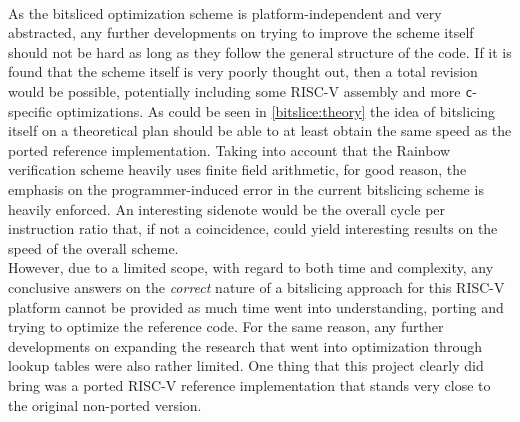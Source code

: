 \medskip\\
As the bitsliced optimization scheme is platform-independent and very abstracted, any further developments on trying to improve the scheme itself should not be hard as long as they follow the general structure of the code. If it is found that the scheme itself is very poorly thought out, then a total revision would be possible, potentially including some RISC-V assembly and more \texttt{c}-specific optimizations. As could be seen in \cref{bitslice:theory} the idea of bitslicing itself on a theoretical plan should be able to at least obtain the same speed as the ported reference implementation. Taking into account that the Rainbow verification scheme heavily uses finite field arithmetic, for good reason, the emphasis on the programmer-induced error in the current bitslicing scheme is heavily enforced. An interesting sidenote would be the overall cycle per instruction ratio that, if not a coincidence, could yield interesting results on the speed of the overall scheme.
\medskip\\
However, due to a limited scope, with regard to both time and complexity, any conclusive answers on the \emph{correct} nature of a bitslicing approach for this RISC-V platform cannot be provided as much time went into understanding, porting and trying to optimize the reference code. For the same reason, any further developments on expanding the research that went into optimization through lookup tables were also rather limited. One thing that this project clearly did bring was a ported RISC-V reference implementation that stands very close to the original non-ported version.